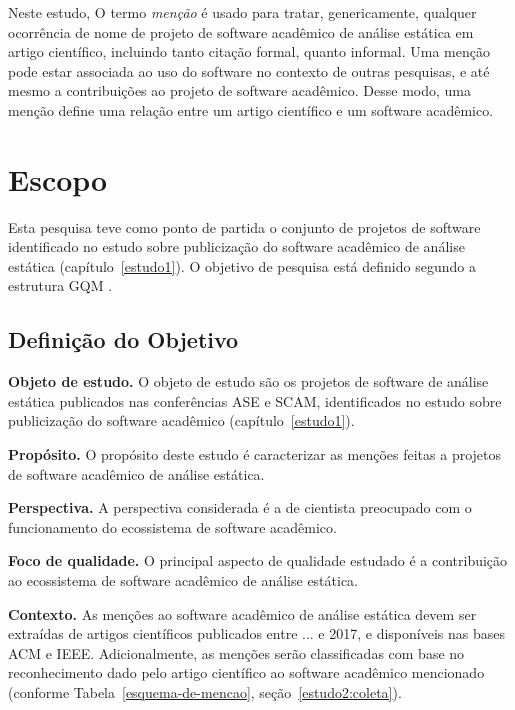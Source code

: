 Neste estudo,
O termo \textit{menção} é usado para tratar, genericamente, qualquer ocorrência de
nome de projeto de software acadêmico de análise estática em artigo científico,
incluindo tanto citação formal, quanto informal.
Uma menção pode estar associada ao uso do software no contexto de outras pesquisas,
e até mesmo a contribuições ao projeto de software acadêmico.
Desse modo, uma menção define uma relação entre um artigo científico e 
um software acadêmico.


\section{Escopo} \label{estudo2:escopo} %

Esta pesquisa teve como ponto de partida
o conjunto de projetos de software identificado
no estudo sobre publicização do software acadêmico de análise estática (capítulo~\ref{estudo1}).
O objetivo de pesquisa está definido segundo a estrutura GQM \cite{basili1994goal}.

\subsection{Definição do Objetivo}

\begin{description}
\item{\bf Objeto de estudo.} 
O objeto de estudo são os projetos de software de análise estática publicados nas conferências ASE e SCAM,
identificados no estudo sobre publicização do software acadêmico (capítulo~\ref{estudo1}).

\item{\bf Propósito.} 
O propósito deste estudo é caracterizar as menções feitas a 
projetos de software acadêmico de análise estática.

\item{\bf Perspectiva.} 
A perspectiva considerada é a de cientista preocupado com o funcionamento do ecossistema de software acadêmico.

\item{\bf Foco de qualidade.} 
O principal aspecto de qualidade estudado é 
a contribuição ao ecossistema de software acadêmico de análise estática.

\item{\bf Contexto.} 
As menções ao software acadêmico de análise estática devem ser extraídas de 
artigos científicos publicados entre ... e 2017, e disponíveis nas bases ACM e IEEE.
Adicionalmente, as menções serão classificadas com base no 
reconhecimento dado pelo artigo científico ao software acadêmico mencionado
(conforme Tabela~\ref{esquema-de-mencao},  seção~\ref{estudo2:coleta}).
\end{description}


